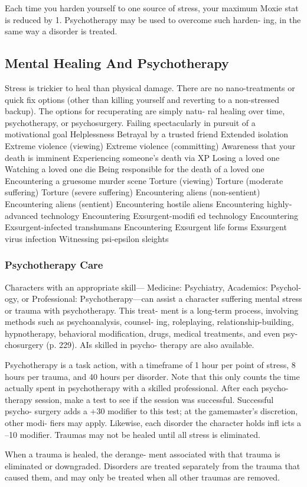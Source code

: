 Each time you harden yourself to one source of 
stress, your maximum Moxie stat is reduced by 1. 
Psychotherapy may be used to overcome such harden-
ing, in the same way a disorder is treated.

\subsection{Mental Healing And Psychotherapy}

Stress is trickier to heal than physical damage. There 
are no nano-treatments or quick fix options (other 
than killing yourself and reverting to a non-stressed 
backup). The options for recuperating are simply natu-
ral healing over time, psychotherapy, or psychosurgery.
Failing spectacularly in pursuit of a motivational goal
Helplessness
Betrayal by a trusted friend
Extended isolation
Extreme violence (viewing)
Extreme violence (committing)
Awareness that your death is imminent
Experiencing someone's death via XP
Losing a loved one
Watching a loved one die
Being responsible for the death of a loved one
Encountering a gruesome murder scene
Torture (viewing)
Torture (moderate suffering)
Torture (severe suffering)
Encountering aliens (non-sentient)
Encountering aliens (sentient)
Encountering hostile aliens
Encountering highly-advanced technology
Encountering Exsurgent-modiﬁ ed technology
Encountering Exsurgent-infected transhumans
Encountering Exsurgent life forms
Exsurgent virus infection
Witnessing psi-epsilon sleights

\subsubsection{Psychotherapy Care}

Characters with an appropriate skill—
Medicine: Psychiatry, Academics: Psychol-
ogy, or Professional: Psychotherapy—can 
assist a character suffering mental stress 
or trauma with psychotherapy. This treat-
ment is a long-term process, involving 
methods such as psychoanalysis, counsel-
ing, roleplaying, relationship-building, 
hypnotherapy, behavioral modification, 
drugs, medical treatments, and even psy-
chosurgery (p. 229). AIs skilled in psycho-
therapy are also available.

Psychotherapy is a task action, with a 
timeframe of 1 hour per point of stress, 
8 hours per trauma, and 40 hours per 
disorder. Note that this only counts the 
time actually spent in psychotherapy with 
a skilled professional. After each psycho-
therapy session, make a test to see if the 
session was successful. Successful psycho-
surgery adds a +30 modifier to this test; at 
the gamemaster's discretion, other modi-
fiers may apply. Likewise, each disorder 
the character holds infl icts a –10 modifier. 
Traumas may not be healed until all stress 
is eliminated.

When a trauma is healed, the derange-
ment associated with that trauma is 
eliminated or downgraded. Disorders are 
treated separately from the trauma that 
caused them, and may only be treated 
when all other traumas are removed.
